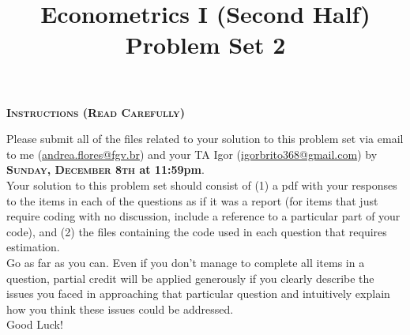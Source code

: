 \documentclass[12pt]{article} %
\begin{document}
	\title{\textcolor{burgundy}{\Large \textbf{Econometrics I} (Second Half)}\\ \Large Problem Set 2 \vspace{-1cm}}
	
	\author{\vspace{-4.5cm} }
	\date{ \vspace{-0.75cm}}
	\maketitle
	
	\begin{mdframed}[backgroundcolor=burgundy!12.5,innerleftmargin=3pt,innerrightmargin=3pt,leftmargin=-3pt,rightmargin=-3pt,topline=false,leftline=false,rightline=false,bottomline=false]
		\begin{mdframed}[backgroundcolor=burgundy!12.5,innerleftmargin=3pt,innerrightmargin=3pt,leftmargin=-3pt,rightmargin=-3pt,topline=false,leftline=false,rightline=false,bottomline=true]
			\textbf{\textsc{Instructions (Read Carefully)}}
		\end{mdframed}
	
			Please submit all of the files related to your solution to this problem set via email to me (\href{mailto:andrea.flores@fgv.br}{andrea.flores@fgv.br}) and your TA Igor (\href{mailto:igorbrito368@gmail.com}{igorbrito368@gmail.com}) by \textbf{\textsc{Sunday, December 8th} at 11:59pm}.\\
	
	Your solution to this problem set should consist of (1) a pdf with your responses to the items in each of the questions as if it was a report (for items that just require coding with no discussion, include a reference to a particular part of your code), and (2) the files containing the code used in each question that requires estimation. \\
	
	Go as far as you can. Even if you don't manage to complete all items in a question, partial credit will be applied generously if you clearly describe the issues you faced in approaching that particular question and intuitively explain how you think these issues could be addressed.\\
	
	{Good Luck!}
		
	\end{mdframed}
\end{document}
